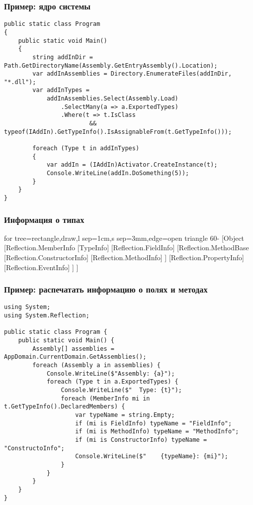 \documentclass[xetex,mathserif,serif]{beamer}
\begin{document}
	\begin{frame}[fragile]
		\frametitle{Пример: ядро системы}
		\begin{scriptsize}
			\begin{verbatim}
public static class Program
{
    public static void Main()
    {
        string addInDir = Path.GetDirectoryName(Assembly.GetEntryAssembly().Location);
        var addInAssemblies = Directory.EnumerateFiles(addInDir, "*.dll");
        var addInTypes =
            addInAssemblies.Select(Assembly.Load)
                .SelectMany(a => a.ExportedTypes)
                .Where(t => t.IsClass 
                        && typeof(IAddIn).GetTypeInfo().IsAssignableFrom(t.GetTypeInfo()));

        foreach (Type t in addInTypes)
        {
            var addIn = (IAddIn)Activator.CreateInstance(t);
            Console.WriteLine(addIn.DoSomething(5));
        }
    }
}
			\end{verbatim}
		\end{scriptsize}
	\end{frame}

	\begin{frame}
		\frametitle{Информация о типах}
		\begin{center}
			\begin{tiny}
				\begin{forest}
					for tree={rectangle,draw,l sep=1cm,s sep=3mm,edge=open triangle 60-}
					[Object
						[Reflection.MemberInfo
							[TypeInfo]
							[Reflection.FieldInfo]
							[Reflection.MethodBase
								[Reflection.ConstructorInfo]
								[Reflection.MethodInfo]
							]
							[Reflection.PropertyInfo]
							[Reflection.EventInfo]
						]
					]
				\end{forest}
			\end{tiny}
		\end{center}
	\end{frame}

	\begin{frame}[fragile]
		\frametitle{Пример: распечатать информацию о полях и методах}
		\begin{scriptsize}
			\begin{verbatim}
using System;
using System.Reflection;

public static class Program {
    public static void Main() {
        Assembly[] assemblies = AppDomain.CurrentDomain.GetAssemblies();
        foreach (Assembly a in assemblies) {
            Console.WriteLine($"Assembly: {a}");
            foreach (Type t in a.ExportedTypes) {
                Console.WriteLine($"  Type: {t}");
                foreach (MemberInfo mi in t.GetTypeInfo().DeclaredMembers) {
                    var typeName = string.Empty;
                    if (mi is FieldInfo) typeName = "FieldInfo";
                    if (mi is MethodInfo) typeName = "MethodInfo";
                    if (mi is ConstructorInfo) typeName = "ConstructoInfo";
                    Console.WriteLine($"    {typeName}: {mi}");
                }
            }
        }
    }
}
			\end{verbatim}
		\end{scriptsize}
	\end{frame}
\end{document}
